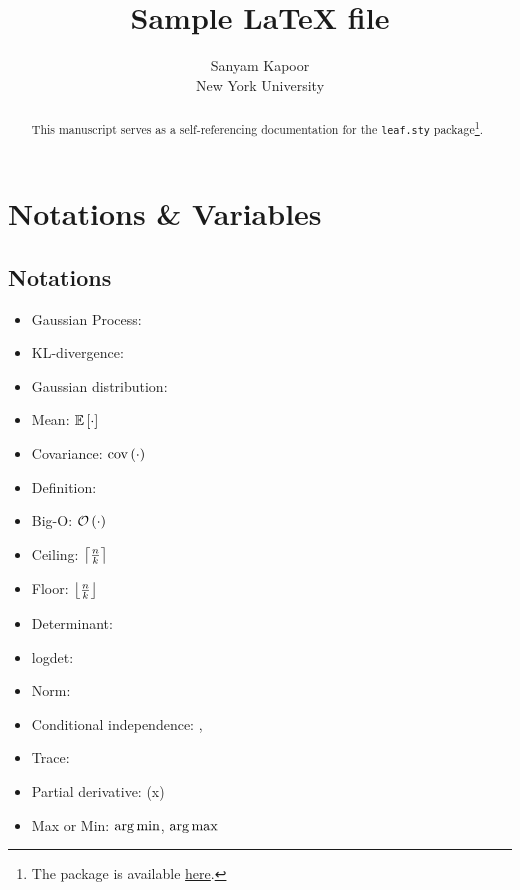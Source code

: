 \documentclass{article}
\begin{document}
\title{Sample \LaTeX{ }file}

\author{\name Sanyam Kapoor \\
        \addr New York University}


\maketitle

\begin{abstract}%
This manuscript serves as a self-referencing documentation for the \texttt{leaf.sty} package\footnote{The package is available \href{https://github.com/activatedgeek/latexfiles}{here}.}.
\end{abstract}


\section{Notations \& Variables}

\subsection{Notations}

\begin{itemize}
\item Gaussian Process: \gp{\cdot,\cdot}
\item KL-divergence: \kl
\item Gaussian distribution: \gaussian{\cdot, \cdot}
\item Mean: $\mathbb{E}\left[\cdot\right]$
\item Covariance: $\mathrm{cov}\left(\cdot\right)$
\item Definition: 
\item Big-O:  $\mathcal{O}\left(\cdot\right)$
\item Ceiling: $\left\lceil \tfrac{n}{k} \right\rceil$
\item Floor: $\left\lfloor \tfrac{n}{k} \right\rfloor$
\item Determinant: \determ{\cdot}
\item logdet: \logdet{\cdot}
\item Norm: \norm{\cdot}
\item Conditional independence: \ci, \nci
\item Trace: \tr{\cdot}
\item Partial derivative: (x)
\item Max or Min: $\operatorname*{\arg\min}$, $\operatorname*{\arg\max}$
\end{itemize}
\end{document}
